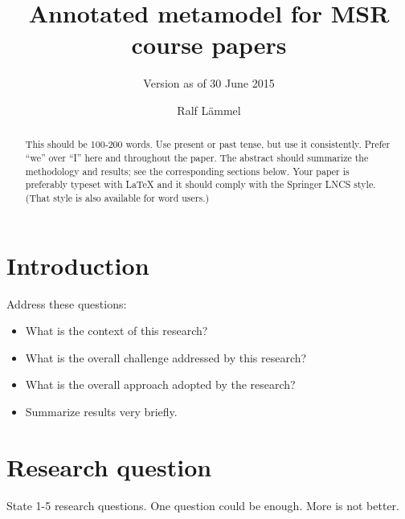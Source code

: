 \documentclass{llncs}
\begin{document}
\title{Annotated metamodel for MSR course papers}

\subtitle{Version as of 30 June 2015}

\author{Ralf L\"ammel}


\maketitle

\begin{abstract}
  This should be 100-200 words. Use present or past tense, but use it
  consistently. Prefer ``we'' over ``I'' here and throughout the
  paper. The abstract should summarize the methodology and results;
  see the corresponding sections below. Your paper is preferably
  typeset with LaTeX and it should comply with the Springer LNCS
  style. (That style is also available for word users.) 
\end{abstract}


\section{Introduction}

Address these questions:

\begin{itemize}

\item What is the context of this research?

\item What is the overall challenge addressed by this research?

\item What is the overall approach adopted by the research?

\item Summarize results very briefly.

\end{itemize}


\section{Research question}

State 1-5 research questions. One question could be enough. More is
not better.
\end{document}

